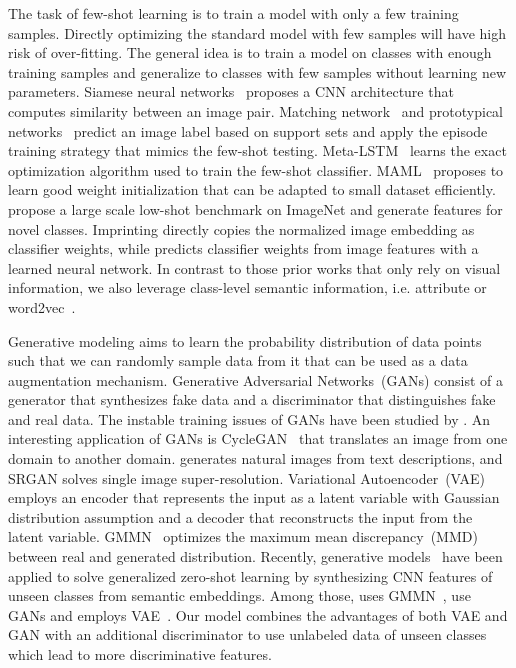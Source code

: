 \documentclass[10pt,twocolumn,letterpaper]{article}
\newcommand{\myparagraph}[1]{\vspace{5pt}\noindent{\bf #1}}
\begin{document}
\myparagraph{Few-shot Learning.} The task of few-shot learning is to train a model with only a few training samples. Directly optimizing the standard model with few samples will have high risk of over-fitting. The general idea is to train a model on classes with enough training samples and generalize to classes with few samples without learning new parameters. Siamese neural networks~\cite{koch2015siamese} proposes a CNN architecture that computes similarity between an image pair. Matching network~\cite{vinyals2016matching} and prototypical networks~\cite{snell2017prototypical} predict an image label based on support sets and apply the episode training strategy that mimics the few-shot testing. 
Meta-LSTM~\cite{ravi2016optimization} learns the exact optimization algorithm used to train the few-shot classifier. MAML~\cite{finn2017model} proposes to learn good weight initialization that can be adapted to small dataset efficiently. \cite{HG16,wang2018low} propose a large scale low-shot benchmark on ImageNet and generate features for novel classes.
Imprinting\cite{qi2018low} directly copies the normalized image embedding as classifier weights, while \cite{qiao2018few} predicts classifier weights from image features with a learned neural network. In contrast to those prior works that only rely on visual information, we also leverage class-level semantic information, i.e. attribute or word2vec~\cite{MSCCD13}. 


\myparagraph{Generative Models.} Generative modeling aims to learn the probability distribution of data points such that we can randomly sample data from it that can be used as a data augmentation mechanism. Generative Adversarial Networks~(GANs)\cite{GPMXWDOCB14,conditionalgans,RMC16} consist of a generator that synthesizes fake data and a discriminator that distinguishes fake and real data. 
The instable training issues of GANs have been studied by \cite{gulrajani2017improved,arjovsky2017towards,miyato2018spectral}. An interesting application of GANs is CycleGAN~\cite{CycleGAN2017} that translates an image from one domain to another domain. \cite{RAYLSL16} generates natural images from text descriptions, and SRGAN\cite{ledig2017photo} solves single image super-resolution. Variational Autoencoder~(VAE)~\cite{kingma2013auto} employs an encoder that represents the input as a latent variable with Gaussian distribution assumption and a decoder that reconstructs the input from the latent variable. GMMN~\cite{li2015generative} optimizes the maximum mean discrepancy~(MMD)~\cite{gretton2007kernel} between real and generated distribution. Recently, generative models~\cite{BHJ17,Zhu_2018_CVPR, Verma_2018_CVPR,XLSA18} have been applied to solve generalized zero-shot learning by synthesizing CNN features of unseen classes from semantic embeddings. Among those, \cite{BHJ17} uses GMMN~\cite{li2015generative}, 
\cite{Zhu_2018_CVPR, XLSA18} use GANs\cite{GPMXWDOCB14} and \cite{Verma_2018_CVPR} employs VAE~\cite{kingma2013auto}. Our model combines the advantages of both VAE and GAN with an additional discriminator to use unlabeled data of unseen classes which lead to more discriminative features. 
\end{document}
